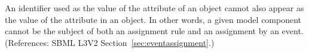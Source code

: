 An identifier used as the value of the attribute  of an
\EventAssignment object cannot also appear as the value of the
 attribute in an \AssignmentRule object.  In other words, a
given model component cannot be the subject of both an assignment rule and
an assignment by an event.  (References: SBML L3V2
Section~\ref{sec:eventassignment}.)

